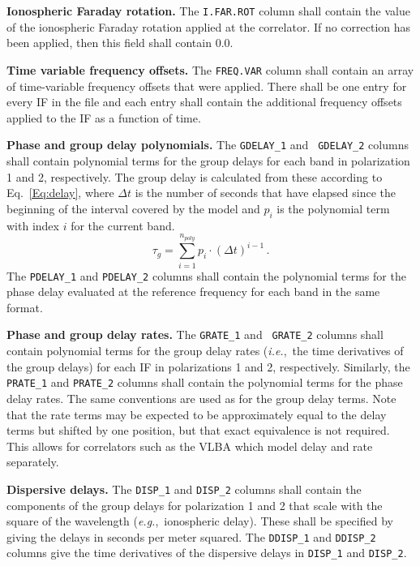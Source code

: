 \documentclass[twoside]{article}
\newcommand{\eg}{{\it e.g.},}
\newcommand{\ie}{{\it i.e.},}
\begin{document}
{\bf Ionospheric Faraday rotation.}  The {\tt I.FAR.ROT} column shall
contain the value of the ionospheric Faraday rotation applied at the
correlator.  If no correction has been applied, then this field shall
contain 0.0.

{\bf Time variable frequency offsets.} The {\tt FREQ.VAR} column shall
contain an array of time-variable frequency offsets that were applied.
There shall be one entry for every IF in the file and each entry shall
contain the additional frequency offsets applied to the IF as a
function of time.

{\bf Phase and group delay polynomials.}  The {\tt GDELAY\_1} and {\tt
  GDELAY\_2} columns shall contain polynomial terms for the group
delays for each band in polarization 1 and 2, respectively.  The
group delay is calculated from these according to Eq.~\ref{Eq:delay},
where $\Delta t$ is the number of seconds that have elapsed since the
beginning of the interval covered by the model and $p_i$ is the
polynomial term with index $i$ for the current band.
\begin{equation}
\tau_g = \sum_{i=1}^{n_{poly}} p_i \cdot \left( \Delta t \right) ^{i-1}
  \label{Eq:delay} \, .
\end{equation}
The {\tt PDELAY\_1} and {\tt PDELAY\_2} columns shall contain the
polynomial terms for the phase delay evaluated at the reference
frequency for each band in the same format.

{\bf Phase and group delay rates.}  The {\tt GRATE\_1} and {\tt
GRATE\_2} columns shall contain polynomial terms for the group delay
rates (\ie\ the time derivatives of the group delays) for each IF in
polarizations 1 and 2, respectively.  Similarly, the {\tt PRATE\_1}
and {\tt PRATE\_2} columns shall contain the polynomial terms for the
phase delay rates.  The same conventions are used as for the group
delay terms.  Note that the rate terms may be expected to be
approximately equal to the delay terms but shifted by one position,
but that exact equivalence is not required.  This allows for
correlators such as the VLBA which model delay and rate separately.

{\bf Dispersive delays.}  The {\tt DISP\_1} and {\tt DISP\_2} columns
shall contain the components of the group delays for polarization 1
and 2 that scale with the square of the wavelength (\eg\ ionospheric
delay).  These shall be specified by giving the delays in seconds
per meter squared.  The {\tt DDISP\_1} and {\tt DDISP\_2} columns
give the time derivatives of the dispersive delays in {\tt DISP\_1}
and {\tt DISP\_2}\@.
\end{document}
